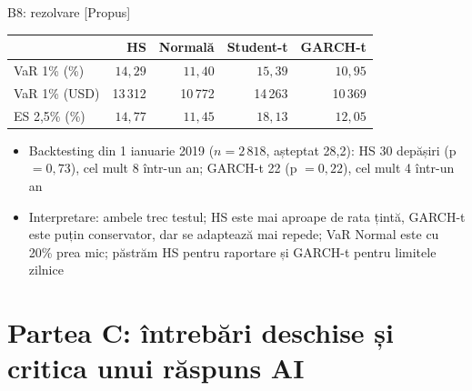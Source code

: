 \ifsolutions
\begin{frame}{B8: rezolvare [Propus]}
\itemsize{\footnotesize}
\begin{center}
\scriptsize
\begin{tabular}{lrrrr}
\toprule
& HS & Normală & Student-t & GARCH-t \\
\midrule
VaR 1\% (\%) & $14{,}29$ & $11{,}40$ & $15{,}39$ & $10{,}95$ \\
VaR 1\% (USD) & 13\,312 & 10\,772 & 14\,263 & 10\,369 \\
ES 2,5\% (\%) & $14{,}77$ & $11{,}45$ & $18{,}13$ & $12{,}05$ \\
\bottomrule
\end{tabular}
\end{center}
\begin{itemize}
    \item Backtesting din 1 ianuarie 2019 ($n = 2\,818$, așteptat 28{,}2): HS 30 depășiri (p $= 0{,}73$), cel mult 8 într-un an; GARCH-t 22 (p $= 0{,}22$), cel mult 4 într-un an
    \item Interpretare: ambele trec testul; HS este mai aproape de rata țintă, GARCH-t este puțin conservator, dar se adaptează mai repede; VaR Normal este cu 20\% prea mic; păstrăm HS pentru raportare și GARCH-t pentru limitele zilnice
\end{itemize}
\end{frame}
\fi


\section{Partea C: întrebări deschise și critica unui răspuns AI}

